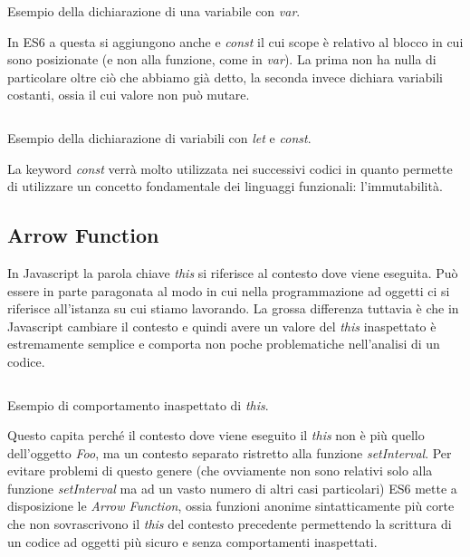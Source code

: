\begin{listing}[ht]
\inputminted{Javascript}{sources/exampleVarES5.js}
\caption{Esempio della dichiarazione di una variabile con \textit{var}.}
\label{exampleVarES5}
\end{listing}

\noindent
In ES6 a questa si aggiungono anche  e \textit{const} il cui scope è relativo al blocco in cui sono posizionate (e non alla funzione, come in \textit{var}). La prima non ha nulla di particolare oltre ciò che abbiamo già detto, la seconda invece dichiara variabili costanti, ossia il cui valore non può mutare.

\begin{listing}[ht]
\inputminted{Javascript}{sources/exampleLetConstES6.js}
\caption{Esempio della dichiarazione di variabili con \textit{let} e \textit{const}.}
\label{exampleLetConstES6}
\end{listing}

\noindent
La keyword \textit{const} verrà molto utilizzata nei successivi codici in quanto permette di utilizzare un concetto fondamentale dei linguaggi funzionali: l'immutabilità\footnotemark.

\subsection{Arrow Function}
In Javascript la parola chiave \textit{this} si riferisce al contesto dove viene eseguita. Può essere in parte paragonata al modo in cui nella programmazione ad oggetti ci si riferisce all'istanza su cui stiamo lavorando. La grossa differenza tuttavia è che in Javascript cambiare il contesto e quindi avere un valore del \textit{this} inaspettato è estremamente semplice e comporta non poche problematiche nell'analisi di un codice.

\begin{listing}[ht]
\inputminted{Javascript}{sources/exampleShadowThisES5.js}
\caption{Esempio di comportamento inaspettato di \textit{this}.}
\label{exampleShadowThisES5}
\end{listing}

\noindent
Questo capita perché il contesto dove viene eseguito il \textit{this} non è più quello dell'oggetto \textit{Foo}, ma un contesto separato ristretto alla funzione \textit{setInterval}. Per evitare problemi di questo genere (che ovviamente non sono relativi solo alla funzione \textit{setInterval} ma ad un vasto numero di altri casi particolari) ES6 mette a disposizione le \textit{Arrow Function}, ossia funzioni anonime sintatticamente più corte che non sovrascrivono il \textit{this} del contesto precedente permettendo la scrittura di un codice ad oggetti più sicuro e senza comportamenti inaspettati.

